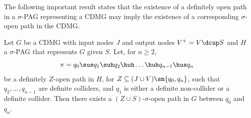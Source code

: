 The following important result states that the existence of a definitely open path in a $\sigma$-PAG representing a CDMG may imply the existence of a corresponding $\sigma$-open path in the CDMG.
\begin{Prp}\label{prp:sigmapag_open_walk_implies_cdmg_open_walk}
  Let $G$ be a CDMG with input nodes $J$ and output nodes $V^+ = V \dcup S$ and $H$ a $\sigma$-PAG that represents $G$ given $S$.
  Let, for $n \ge 2$,
    \[\pi = q_0 \sus q_1 \suh q_2 \huh \dots \huh q_{n-1} \hus q_n\] 
  be a definitely $Z$-open path in $H$, for $Z \subseteq (J \cup V) \sm \{q_0,q_n\}$,
  such that $q_2, \dots, q_{n-1}$ are definite colliders, and $q_{1}$ is either a definite non-collider or a definite collider.
  Then there exists a $(Z \cup S)$-$\sigma$-open path in $G$ between $q_0$ and $q_n$.
\end{Prp}
